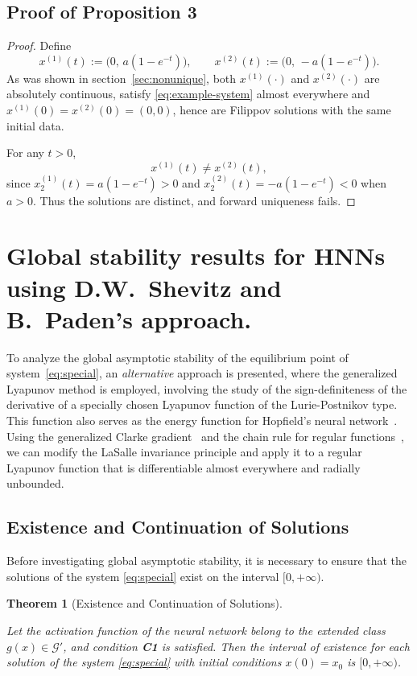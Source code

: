 \documentclass[journal]{IEEEtran}
\theoremstyle{myplain}
\newtheorem{theorem}{Theorem}
\begin{document}
\subsection{Proof of Proposition 3}\label{prop3_proof}
\begin{proof}
Define
\[
x^{(1)}(t):=\bigl(0,\,a(1-e^{-t})\bigr),\qquad x^{(2)}(t):=\bigl(0,\,-a(1-e^{-t})\bigr).
\]
As was shown in section~\ref{sec:nonunique}, both $x^{(1)}(\cdot)$ and $x^{(2)}(\cdot)$ are absolutely continuous, satisfy \eqref{eq:example-system} almost everywhere and $x^{(1)}(0)=x^{(2)}(0)=(0,0)$, hence are Filippov solutions with the same initial data.

For any $t>0$,
\[
x^{(1)}(t)\neq x^{(2)}(t),
\]
since $x_{2}^{(1)}(t)=a(1-e^{-t})>0$ and $x_{2}^{(2)}(t)=-a(1-e^{-t})<0$ when $a>0$. Thus the solutions are distinct, and forward uniqueness fails.
\end{proof}

\section{Global stability results for HNNs using D.W.~Shevitz and B.~Paden's approach.} \label{app:proofs}


To analyze the global asymptotic stability of the equilibrium point of system~\eqref{eq:special}, 
an \emph{alternative} approach is presented, where the 
generalized Lyapunov method \cite{ShevitzPaden1994} is employed, 
involving the study of the sign-definiteness of the derivative of a specially chosen Lyapunov function of the Lurie-Postnikov type.
This function also serves as the energy function for Hopfield's neural network~\cite{p10}.
Using the generalized Clarke gradient~\cite{p14} and the chain rule for regular functions~\cite{ShevitzPaden1994},
we can modify the LaSalle invariance principle \cite[Cor. 4.2, p. 129]{p223}
and apply it to a regular Lyapunov function that is differentiable almost everywhere and radially unbounded.

\subsection{Existence and Continuation of Solutions}
Before investigating global asymptotic stability, it is necessary to ensure that the solutions of the system \eqref{eq:special} exist on the interval $[0, +\infty)$.

\begin{theorem}[Existence and Continuation of Solutions]\label{max_int}

Let the activation function of the neural network belong to the extended class $g(x)\in \mathcal{G'}$, and condition \textbf{C1} is satisfied. Then the interval of existence for each solution of the system \eqref{eq:special} with initial conditions $x(0) = x_0$ is $[0, +\infty)$.

\end{theorem}
\end{document}
